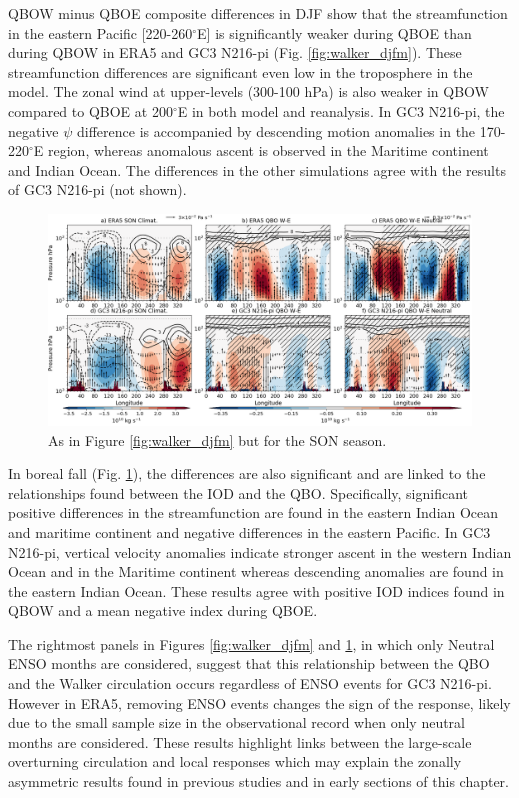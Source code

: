 QBOW minus QBOE composite differences in DJF show that the streamfunction in the eastern Pacific [220-260$^\circ$E] is significantly weaker during QBOE than during QBOW in ERA5 and GC3 N216-pi (Fig. \ref{fig:walker_djfm}). These streamfunction differences are significant even low in the troposphere in the model. The zonal wind at upper-levels (300-100 hPa) is also weaker in QBOW compared to QBOE at 200$^\circ$E in both model and reanalysis. In GC3 N216-pi, the negative $\psi$ difference is accompanied by descending motion anomalies in the 170-220$^\circ$E region, whereas anomalous ascent is observed in the Maritime continent and Indian Ocean. The differences in the other simulations agree with the results of GC3 N216-pi (not shown).

\begin{figure}[t!]
\centering
 \noindent
 \includegraphics[width=\linewidth]{figures/cmip_era5_streamson.png}
\caption[Walker circulation anomalies in SON]{As in Figure \ref{fig:walker_djfm} but for the SON season. }
\label{fig:walker_son}
\end{figure}

In boreal fall (Fig. \ref{fig:walker_son}), the differences are also significant and are linked to the relationships found between the IOD and the QBO. 
Specifically, significant positive differences in the streamfunction are found 
in the eastern Indian Ocean and maritime continent and negative differences in the eastern Pacific. 
In GC3 N216-pi, vertical velocity anomalies indicate stronger ascent in the western Indian Ocean and in the Maritime continent whereas descending anomalies are found in the eastern Indian Ocean. These results agree with positive IOD indices found in QBOW and a mean negative index during QBOE.



The rightmost panels in  Figures \ref{fig:walker_djfm} and \ref{fig:walker_son}, in which only Neutral ENSO months are considered, suggest that this relationship between the QBO and the Walker circulation occurs regardless of ENSO events for GC3 N216-pi. However in ERA5, removing ENSO events changes the sign of the response, likely due to the small sample size in the observational record when only neutral months are considered. 
These results highlight links between the large-scale overturning circulation and local responses which may explain the zonally asymmetric results found in previous studies and in early sections of this chapter.

